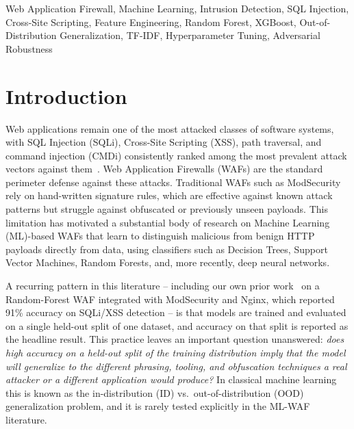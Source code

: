 \documentclass[conference]{IEEEtran}
\begin{document}
\begin{abstract}
unchanged for every model (at most $\pm$0.45 points), ruling out
under-tuning as the explanation. Second, a battery of six black-box
adversarial string transforms shows the trained models are largely robust
to common WAF-bypass-style obfuscation (0.000--0.002 evasion for five of
six transforms), with one exception: a length-padding dilution attack
achieves modest (2--5\%) evasion specifically against the two
tree-ensemble models (Random Forest, XGBoost), while leaving the other four
models unaffected. We argue that in-distribution accuracy is an unreliable
proxy for deployment readiness of ML-based WAFs, that the generalization
gap we document is not fixable by tuning, and that OOD / cross-corpus
evaluation should become a standard reporting requirement in this line of
research. All code, trained models, metrics, and figures are released for
reproducibility.
\end{abstract}

\begin{IEEEkeywords}
Web Application Firewall, Machine Learning, Intrusion Detection, SQL
Injection, Cross-Site Scripting, Feature Engineering, Random Forest, XGBoost,
Out-of-Distribution Generalization, TF-IDF, Hyperparameter Tuning,
Adversarial Robustness
\end{IEEEkeywords}

\section{Introduction}

Web applications remain one of the most attacked classes of software systems,
with SQL Injection (SQLi), Cross-Site Scripting (XSS), path traversal, and
command injection (CMDi) consistently ranked among the most prevalent attack
vectors against them~\cite{owasp}. Web Application Firewalls (WAFs) are the
standard perimeter defense against these attacks. Traditional WAFs such as
ModSecurity~\cite{modsecurity} rely on hand-written signature rules, which are
effective against known attack patterns but struggle against obfuscated or
previously unseen payloads. This limitation has motivated a substantial body
of research on Machine Learning (ML)-based WAFs that learn to distinguish
malicious from benign HTTP payloads directly from data, using classifiers such
as Decision Trees, Support Vector Machines, Random Forests, and, more
recently, deep neural networks.

A recurring pattern in this literature -- including our own prior
work~\cite{ourprior} on a Random-Forest WAF integrated with ModSecurity and
Nginx, which reported 91\% accuracy on SQLi/XSS detection -- is that models
are trained and evaluated on a single held-out split of one dataset, and
accuracy on that split is reported as the headline result. This practice
leaves an important question unanswered: \emph{does high accuracy on a
held-out split of the training distribution imply that the model will
generalize to the different phrasing, tooling, and obfuscation techniques a
real attacker or a different application would produce?} In classical machine
learning this is known as the in-distribution (ID) vs.\ out-of-distribution
(OOD) generalization problem, and it is rarely tested explicitly in the
ML-WAF literature.
\end{document}

